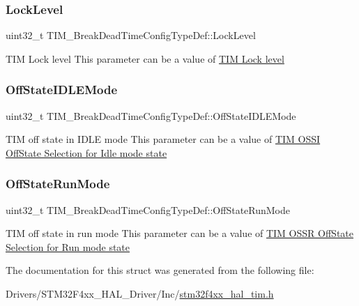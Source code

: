 \subsubsection{\texorpdfstring{Lock\+Level}{LockLevel}}
{\footnotesize\ttfamily uint32\+\_\+t T\+I\+M\+\_\+\+Break\+Dead\+Time\+Config\+Type\+Def\+::\+Lock\+Level}

T\+IM Lock level This parameter can be a value of \hyperlink{group___t_i_m___lock__level}{T\+IM Lock level} \mbox{\label{struct_t_i_m___break_dead_time_config_type_def_a49f39e31ac019b9b7a20751bfd01c6c4}} 
\subsubsection{\texorpdfstring{Off\+State\+I\+D\+L\+E\+Mode}{OffStateIDLEMode}}
{\footnotesize\ttfamily uint32\+\_\+t T\+I\+M\+\_\+\+Break\+Dead\+Time\+Config\+Type\+Def\+::\+Off\+State\+I\+D\+L\+E\+Mode}

T\+IM off state in I\+D\+LE mode This parameter can be a value of \hyperlink{group___t_i_m___o_s_s_i___off___state___selection__for___idle__mode__state}{T\+IM O\+S\+SI Off\+State Selection for Idle mode state} \mbox{\label{struct_t_i_m___break_dead_time_config_type_def_a5e97751b5e397414e2a5120eb5cef7c6}} 
\subsubsection{\texorpdfstring{Off\+State\+Run\+Mode}{OffStateRunMode}}
{\footnotesize\ttfamily uint32\+\_\+t T\+I\+M\+\_\+\+Break\+Dead\+Time\+Config\+Type\+Def\+::\+Off\+State\+Run\+Mode}

T\+IM off state in run mode This parameter can be a value of \hyperlink{group___t_i_m___o_s_s_r___off___state___selection__for___run__mode__state}{T\+IM O\+S\+SR Off\+State Selection for Run mode state} 

The documentation for this struct was generated from the following file\+:\begin{DoxyCompactItemize}
\item 
Drivers/\+S\+T\+M32\+F4xx\+\_\+\+H\+A\+L\+\_\+\+Driver/\+Inc/\hyperlink{stm32f4xx__hal__tim_8h}{stm32f4xx\+\_\+hal\+\_\+tim.\+h}\end{DoxyCompactItemize}
